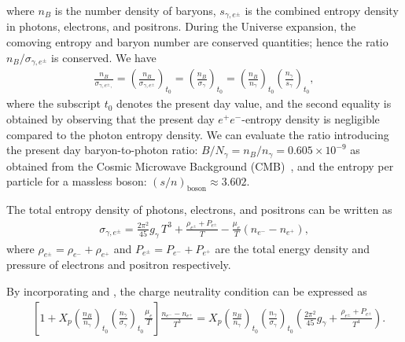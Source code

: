 where $n_B$ is the number density of baryons, $s_{\gamma,e^\pm}$ is the combined entropy density in photons, electrons, and positrons. During the Universe expansion, the comoving entropy and baryon number are conserved quantities; hence the ratio $n_B/\sigma_{\gamma,e^\pm}$ is conserved. We have
\begin{align}
\frac{n_B}{\sigma_{\gamma,e^\pm,}}=\left(\frac{n_B}{\sigma_{\gamma,e^\pm}}\right)_{t_0}\!\!\!\!=\left(\frac{n_B}{\sigma_{\gamma}}\right)_{t_0}\!\!\!\!=\left(\frac{n_B}{n_\gamma}\right)_{t_0}\left(\frac{n_\gamma}{s_{\gamma}}\right)_{t_0},
\end{align}
where the subscript $t_0$ denotes the present day value, and the second equality is obtained by observing that the present day $e^+e^-$-entropy density is negligible compared to the photon entropy density. We can evaluate the ratio introducing the present day baryon-to-photon ratio: $B/N_\gamma =n_B/n_\gamma= 0.605\times10^{-9}$ as obtained from the Cosmic Microwave Background (CMB)~\cite{ParticleDataGroup:2022pth}, and the entropy per particle for a massless boson: $(s/n)_{\mathrm{boson}}\approx 3.602$.

The total entropy density of photons, electrons, and positrons can be written as
\begin{align}\label{entropy_per_baryon}
\sigma_{\gamma,e^\pm}=\frac{2\pi^2}{45}g_\gamma\,T^3+\frac{\rho_{e^\pm}+P_{e^\pm}}{T}-\frac{\mu_e}{T}(n_{e^-}-n_{{e^+}}),
 \end{align}
where $ \rho_{e^\pm}=\rho_{e^-}+\rho_{e^+}$ and $P_{e^\pm}=P_{e^-}+P_{{e^+}}$ are the total energy density and pressure of electrons and positron respectively.

By incorporating  and , the charge neutrality condition can be expressed as
\begin{align}\label{charge_neutral_cond3}
 &\left[1+X_p\left(\frac{n_B}{n_\gamma}\right)_{\!t_0}\!\!\left(\frac{n_\gamma}{\sigma_{\gamma}}\right)_{\!t_0}\!\!\frac{\mu_e}{T}\right]\frac{n_{e^-}-n_{{e^+}}}{T^3}=X_p\left(\frac{n_B}{n_\gamma}\right)_{\!t_0}\!\!\left(\frac{n_\gamma}{\sigma_{\gamma}}\right)_{\!t_0}\!\!\left(\frac{2\pi^2}{45}g_\gamma+\frac{\rho_{e^\pm}+P_{e^\pm}}{T^4}\right).
\end{align}

